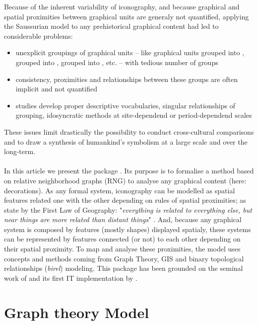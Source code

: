 \documentclass[article]{jss}\usepackage{knitr}
\begin{document}
Because of the inherent variability of iconography, and because graphical and spatial proximities between graphical units are generaly not quantified, applying the Saussurian model to any prehistorical graphical content had led to considerable problems:
\begin{itemize}
\setlength\itemsep{.05em}
\item unexplicit groupings of graphical units -- like graphical units grouped into ,   grouped into ,  grouped into , etc. -- with tedious number of groups
\item consistency, proximities and relationships between these groups are often implicit and not quantified
\item studies develop proper descriptive vocabularies, singular relationships of grouping, idosyncratic methods at site-dependend or period-dependend scales 
\end{itemize}

These issues limit drastically the possibility to conduct cross-cultural comparisons and to draw a synthesis of humankind's symbolism at a large scale and over the long-term.  
\\
\\
In this article we present the  package . Its purpose is to formalise a method based on relative neighborhood graphs (RNG) to analyse any graphical content (here: decorations). As any formal system, iconography can be modelled as spatial features related one with the other depending on rules of spatial proximities; as state by the First Law of Geography: "\emph{everything is related to everything else, but near things are more related than distant things}" \citep{Tobler70}. And, because any graphical system is composed by features (mostly shapes) displayed spatialy, these systems can be represented by features connected (or not) to each other depending on their spatial proximity. To map and analyse these proximities, the model uses concepts and methods coming from Graph Theory, GIS and binary topological relationships (\emph{birel}) modeling. This package has been grounded on the seminal work of \citet{Alexander08} and its first IT implementation by \citet{Huet18a}. 

\section[Model]{Graph theory Model} \label{sec:model}
\end{document}
